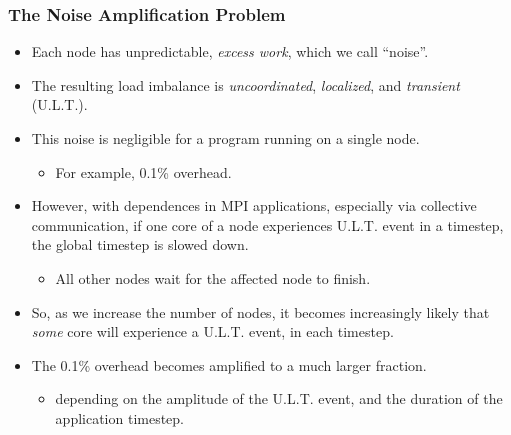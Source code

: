 \begin{frame}
\frametitle{The Noise Amplification Problem}
\begin{itemize}
\item \small Each node has unpredictable, \textit{excess work}, 
which we call ``noise''.  \\ 
\item \small The resulting load imbalance is  \textit{uncoordinated},
  \textit{localized}, and \textit{transient} (U.L.T.).  \\ 
\item \small This noise is negligible for a program running on a
  single node. \\
\begin{itemize} 
\item \small For example, 0.1\% overhead.  
\end{itemize}  

\item However, with dependences in MPI applications, especially via collective communication, 
if one core of a node experiences U.L.T. event in a timestep, the global timestep is slowed 
down. 
\begin{itemize}
\item \small All other nodes wait for the affected node to finish.  
\end{itemize}

\item \small So, as we increase the number of nodes, it becomes increasingly likely that
\textit{some} core will experience a U.L.T. event, in each timestep. 
\item \small The 0.1\% overhead becomes amplified to a much larger fraction. 
\begin{itemize}
\item \small depending on the amplitude of the U.L.T. event,
and the duration of the application timestep. 
\end{itemize}



\end{itemize}
\end{frame} 

